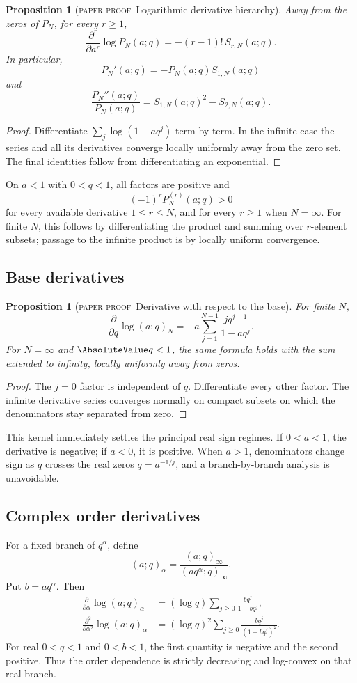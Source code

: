 \documentclass[11pt,oneside]{article}
\newtheorem{proposition}[theorem]{Proposition}
\theoremstyle{definition}
\theoremstyle{remark}
\theoremstyle{plain}
\theoremstyle{definition}
\theoremstyle{remark}
\newcommand{\statusproved}{\textcolor{provedgreen}{\textsc{paper proof}}}
\numberwithin{equation}{section}
\numberwithin{figure}{section}
\numberwithin{table}{section}
\let\reportsubsection\subsection
\let\reportsubsubsection\subsubsection
\let\section\reportsubsection
\let\subsection\reportsubsubsection
\begin{document}
\begin{proposition}[\statusproved\ Logarithmic derivative hierarchy]
Away from the zeros of \(P_N\), for every \(r\ge1\),
\[
 \frac{\partial^r}{\partial a^r}\log P_N(a;q)
 =-(r-1)!\,S_{r,N}(a;q).
\]
In particular,
\[
 P_N'(a;q)=-P_N(a;q)S_{1,N}(a;q)
\]
and
\[
 \frac{P_N''(a;q)}{P_N(a;q)}
 =S_{1,N}(a;q)^2-S_{2,N}(a;q).
\]
\end{proposition}
\begin{proof}
Differentiate \(\sum_j\log(1-aq^j)\) term by term.  In the infinite case the
series and all its derivatives converge locally uniformly away from the zero
set.  The final identities follow from differentiating an exponential.
\end{proof}

On \(a<1\) with \(0<q<1\), all factors are positive and
\[
 (-1)^rP_N^{(r)}(a;q)>0
\]
for every available derivative \(1\le r\le N\), and for every \(r\ge1\) when
\(N=\infty\).  For finite \(N\), this follows by differentiating the product
and summing over \(r\)-element subsets; passage to the infinite product is by
locally uniform convergence.

\section{Base derivatives}
\begin{proposition}[\statusproved\ Derivative with respect to the base]
For finite \(N\),
\[
 \frac{\partial}{\partial q}\log(a;q)_N
 =-a\sum_{j=1}^{N-1}\frac{j q^{j-1}}{1-aq^j}.
\]
For \(N=\infty\) and \(\AbsoluteValue q<1\), the same formula holds with the sum extended
to infinity, locally uniformly away from zeros.
\end{proposition}
\begin{proof}
The \(j=0\) factor is independent of \(q\).  Differentiate every other factor.
The infinite derivative series converges normally on compact subsets on which
the denominators stay separated from zero.
\end{proof}

This kernel immediately settles the principal real sign regimes.  If
\(0<a<1\), the derivative is negative; if \(a<0\), it is positive.  When
\(a>1\), denominators change sign as \(q\) crosses the real zeros
\(q=a^{-1/j}\), and a branch-by-branch analysis is unavoidable.

\section{Complex order derivatives}
For a fixed branch of \(q^\alpha\), define
\[
 (a;q)_\alpha=\frac{(a;q)_\infty}{(aq^\alpha;q)_\infty}.
\]
Put \(b=aq^\alpha\).  Then
\begin{align*}
 \frac{\partial}{\partial\alpha}\log(a;q)_\alpha
 &=(\log q)\sum_{j\ge0}\frac{bq^j}{1-bq^j},\\
 \frac{\partial^2}{\partial\alpha^2}\log(a;q)_\alpha
 &=(\log q)^2\sum_{j\ge0}\frac{bq^j}{(1-bq^j)^2}.
\end{align*}
For real \(0<q<1\) and \(0<b<1\), the first quantity is negative and the
second positive.  Thus the order dependence is strictly decreasing and
log-convex on that real branch.
\end{document}
